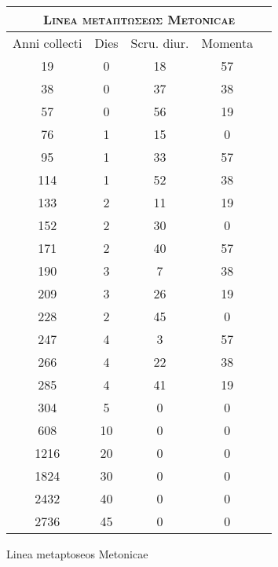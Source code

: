 %
\normalsize
\centering
\begin{tabular}{@{}c c c c c@{} }
\toprule
\multicolumn{5}{c}{\Large\textsc{Linea \textgreek{μεταπτώσεως} Metonicae}}\\
\midrule
\multicolumn{1}{c}{Anni collecti} &
\multicolumn{1}{c}{Dies} &
\multicolumn{1}{c}{Scru. diur.} & %
\multicolumn{1}{c}{Momenta}
\\
\midrule
  19 &  0 & 18 & 57 \\
  38 &  0 & 37 & 38 \\
  57 &  0 & 56 & 19 \\
  76 &  1 & 15 &  0 \\
  95 &  1 & 33 & 57 \\
 114 &  1 & 52 & 38 \\
 133 &  2 & 11 & 19 \\
 152 &  2 & 30 &  0 \\
 171 &  2 & 40 & 57 \\
 190 &  3 &  7 & 38 \\
 209 &  3 & 26 & 19 \\
 228 &  2 & 45 &  0 \\
 247 &  4 &  3 & 57 \\
 266 &  4 & 22 & 38 \\
 285 &  4 & 41 & 19 \\
 304 &  5 &  0 &  0 \\
\midrule
 608 & 10 &  0 &  0 \\
1216 & 20 &  0 &  0 \\
1824 & 30 &  0 &  0 \\
2432 & 40 &  0 &  0 \\
2736 & 45 &  0 &  0 \\
\bottomrule
\end{tabular}
%
\caption{Linea metaptoseos Metonicae}
